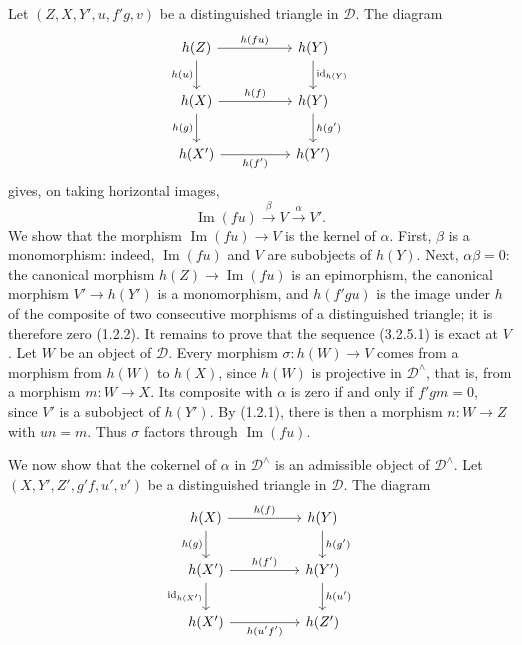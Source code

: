 \clearpage
{}%
\begingroup\small\setlength{\parskip}{0pt}\setlength{\emergencystretch}{1.5em}
Let $(Z,X,Y',u,f'g,v)$ be a distinguished triangle in $\mathcal D$. The diagram
\[
\begin{tikzcd}[column sep=5em,row sep=2.1em]
h(Z)\arrow[r,"h(fu)"]\arrow[d,"h(u)"']&h(Y)\arrow[d,"\operatorname{id}_{h(Y)}"]\\
h(X)\arrow[r,"h(f)"]\arrow[d,"h(g)"']&h(Y)\arrow[d,"h(g')"]\\
h(X')\arrow[r,"h(f')"']&h(Y')
\end{tikzcd}
\]
gives, on taking horizontal images,
\[
\operatorname{Im}(fu)\xrightarrow{\beta}V\xrightarrow{\alpha}V'.
\tag{3.2.5.1}
\]
We show that the morphism $\operatorname{Im}(fu)\to V$ is the kernel of
$\alpha$. First, $\beta$ is a monomorphism: indeed,
$\operatorname{Im}(fu)$ and $V$ are subobjects of $h(Y)$. Next,
$\alpha\beta=0$: the canonical morphism
$h(Z)\to\operatorname{Im}(fu)$ is an epimorphism, the canonical morphism
$V'\to h(Y')$ is a monomorphism, and $h(f'gu)$ is the image under $h$ of the
composite of two consecutive morphisms of a distinguished triangle; it is
therefore zero (1.2.2). It remains to prove that the sequence (3.2.5.1) is
exact at $V$. Let $W$ be an
object of $\mathcal D$. Every morphism $\sigma\colon h(W)\to V$ comes from a
morphism from $h(W)$ to $h(X)$, since $h(W)$ is projective in
$\mathcal D^\wedge$, that is, from a morphism $m\colon W\to X$. Its composite
with $\alpha$ is zero if and only if $f'gm=0$, since $V'$ is a subobject of
$h(Y')$. By (1.2.1), there is then a morphism $n\colon W\to Z$ with $un=m$.
Thus $\sigma$ factors through $\operatorname{Im}(fu)$.

We now show that the cokernel of $\alpha$ in $\mathcal D^\wedge$ is an
admissible object of $\mathcal D^\wedge$. Let
$(X,Y',Z',g'f,u',v')$ be a distinguished triangle in $\mathcal D$. The diagram
\[
\begin{tikzcd}[column sep=5em,row sep=2em]
h(X)\arrow[r,"h(f)"]\arrow[d,"h(g)"']&h(Y)\arrow[d,"h(g')"]\\
h(X')\arrow[r,"h(f')"]\arrow[d,"\operatorname{id}_{h(X')}"']&h(Y')\arrow[d,"h(u')"]\\
h(X')\arrow[r,"h(u'f')"']&h(Z')
\end{tikzcd}
\]
\endgroup
